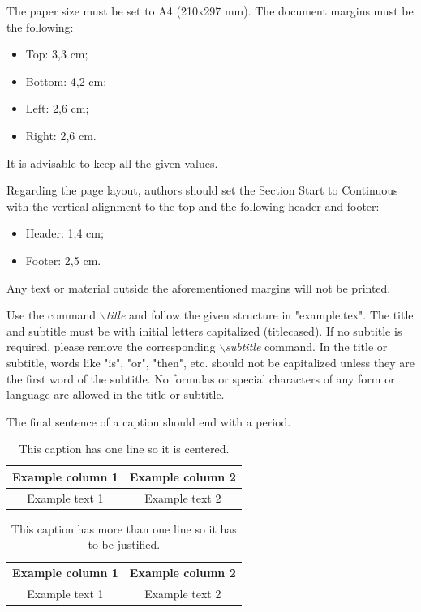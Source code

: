 \documentclass[a4paper,twoside]{article}
\begin{document}
The paper size must be set to A4 (210x297 mm). The document
margins must be the following:

\begin{itemize}
    \item Top: 3,3 cm;
    \item Bottom: 4,2 cm;
    \item Left: 2,6 cm;
    \item Right: 2,6 cm.
\end{itemize}

It is advisable to keep all the given values.


Regarding the page layout, authors should set the Section Start to Continuous with the vertical alignment to the top and the following header and footer:

\begin{itemize}
    \item Header: 1,4 cm;
    \item Footer: 2,5 cm.
\end{itemize}

Any text or material outside the aforementioned margins will not be printed.


Use the command \textit{$\backslash$title} and follow the given structure in "example.tex". The title and subtitle must be with initial letters
capitalized (titlecased). If no subtitle is required, please remove the corresponding \textit{$\backslash$subtitle} command. In the title or subtitle, words like "is", "or", "then", etc. should not be capitalized unless they are the first word of the subtitle. No formulas or special characters of any form or language are allowed in the title or subtitle.

The final sentence of a caption should end with a period.

\begin{table}[h]
\caption{This caption has one line so it is
centered.}\label{tab:example1} \centering
\begin{tabular}{|c|c|}
  \hline
  Example column 1 & Example column 2 \\
  \hline
  Example text 1 & Example text 2 \\
  \hline
\end{tabular}
\end{table}

\begin{table}[h]
\caption{This caption has more than one line so it has to be
justified.}\label{tab:example2} \centering
\begin{tabular}{|c|c|}
  \hline
  Example column 1 & Example column 2 \\
  \hline
  Example text 1 & Example text 2 \\
  \hline
\end{tabular}
\end{table}
\end{document}
